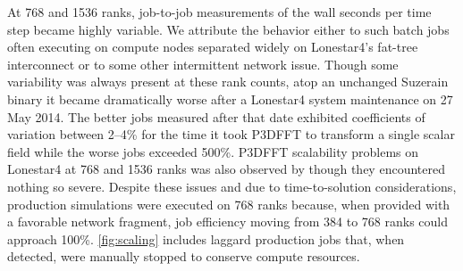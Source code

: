 At 768 and 1536 ranks, job-to-job measurements of the wall seconds per time step
became highly variable.  We attribute the behavior either to such batch jobs
often executing on compute nodes separated widely on Lonestar4's fat-tree
interconnect or to some other intermittent network issue.  Though some
variability was always present at these rank counts, atop an unchanged Suzerain
binary it became dramatically worse after a Lonestar4 system maintenance on 27
May 2014.  The better jobs measured after that date exhibited coefficients of
variation between 2--4\% for the time it took P3DFFT to transform a single
scalar field while the worse jobs exceeded 500\%.  P3DFFT scalability problems
on Lonestar4 at 768 and 1536 ranks was also observed by \citet{Lee2013Petascale}
though they encountered nothing so severe.  Despite these issues and due to
time-to-solution considerations, production simulations were executed on 768
ranks because, when provided with a favorable network fragment, job efficiency
moving from 384 to 768 ranks could approach 100\%.  \autoref{fig:scaling}
includes laggard production jobs that, when detected, were manually stopped to
conserve compute resources.


